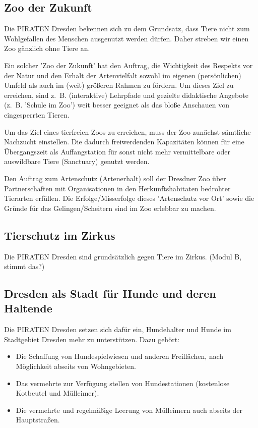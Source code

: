 \documentclass[a4paper, 11pt]{article}
\begin{document}
\subsection{Zoo der Zukunft}
Die PIRATEN Dresden bekennen sich zu dem Grundsatz, dass Tiere nicht zum Wohlgefallen des Menschen ausgenutzt werden dürfen. Daher streben wir einen Zoo gänzlich ohne Tiere an.\newline

Ein solcher 'Zoo der Zukunft' hat den Auftrag, die Wichtigkeit des Respekts vor der Natur und den Erhalt der Artenvielfalt sowohl im eigenen (persönlichen) Umfeld als auch im (weit) größeren Rahmen zu fördern. Um dieses Ziel zu erreichen, sind z. B. (interaktive) Lehrpfade und gezielte didaktische Angebote (z. B. 'Schule im Zoo') weit besser geeignet als das bloße Anschauen von eingesperrten Tieren.\newline

Um das Ziel eines tierfreien Zoos zu erreichen, muss der Zoo zunächst sämtliche Nachzucht einstellen. Die dadurch freiwerdenden Kapazitäten können für eine Übergangszeit als Auffangstation für sonst nicht mehr vermittelbare oder auswildbare Tiere (Sanctuary) genutzt werden.\newline

Den Auftrag zum Artenschutz (Artenerhalt) soll der Dresdner Zoo über Partnerschaften mit Organisationen in den Herkunftshabitaten bedrohter Tierarten erfüllen. Die Erfolge/Misserfolge dieses 'Artenschutz vor Ort' sowie die Gründe für das Gelingen/Scheitern sind im Zoo erlebbar zu machen.


\subsection{Tierschutz im Zirkus}
Die PIRATEN Dresden sind grundsätzlich gegen Tiere im Zirkus. (Modul B, stimmt das?)


\subsection{Dresden als Stadt für Hunde und deren Haltende}
Die PIRATEN Dresden setzen sich dafür ein, Hundehalter und Hunde im Stadtgebiet Dresden mehr zu unterstützen. Dazu gehört:

\begin{itemize}
    \item Die Schaffung von Hundespielwiesen und anderen Freiflächen, nach Möglichkeit abseits von Wohngebieten.

    \item Das vermehrte zur Verfügung stellen von Hundestationen (kostenlose Kotbeutel und Mülleimer).

    \item Die vermehrte und regelmäßige Leerung von Mülleimern auch abseits der Hauptstraßen.
\end{itemize}
\end{document}
